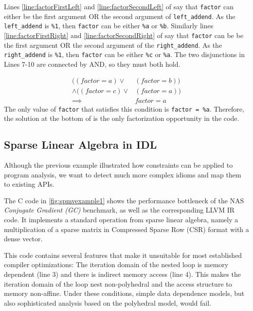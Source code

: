     Lines \ref{line:factorFirstLeft} and \ref{line:factorSecondLeft} of
     say that {\tt factor} can either be the first
    argument OR the second argument of {\tt left\_addend}.
    As the {\tt left\_addend} is {\tt \%1}, then {\tt factor} can be either
    {\tt \%a} or {\tt \%b}.
    Similarly lines \ref{line:factorFirstRight} and
    \ref{line:factorSecondRight} of  say that
    {\tt factor} can be be the first argument OR the second argument of the
    {\tt right\_addend}.
    As the {\tt right\_addend} is {\tt \%1}, then {\tt factor} can be either
    {\tt \%c} or {\tt \%a}.
    The two disjunctions in Lines 7-10 are connected by AND, so they must both
    hold.

\begin{equation}
\begin{split}
((factor = a) \lor & (factor = b)) \\\land ((factor = c) \lor & (factor = a)) \\
\implies & factor = a 
\end{split}
\nonumber
\end{equation}
The only value of {\tt factor} that satisfies this condition is {\tt factor = \%a}.
Therefore, the solution at the bottom of  is the only factorization opportunity in the code.

\begin{figure}[p]
    
\end{figure}

\subsection{Sparse Linear Algebra in IDL}

    Although the previous example illustrated how constraints can be applied to 
    program analysis, we want to detect much more complex idioms and 
    map them to existing APIs.

    The C code in \autoref{fig:spmvexample1} shows the performance bottleneck of
    the NAS \emph{Conjugate Gradient (GC)} benchmark, as well as the
    corresponding LLVM IR code.
    It implements a standard operation from sparse linear algebra, namely a
    multiplication of a sparse matrix in Compressed Sparse Row (CSR) format with
    a dense vector.

    This code contains several features that make it unsuitable for most
    established compiler optimizations:
    The iteration domain of the nested loop is memory dependent (line 3) and
    there is indirect memory access (line 4).
    This makes the iteration domain of the loop nest non-polyhedral and the
    access structure to memory non-affine.
    Under these conditions, simple data dependence models, but also
    sophisticated analysis based on the polyhedral model, would fail.

